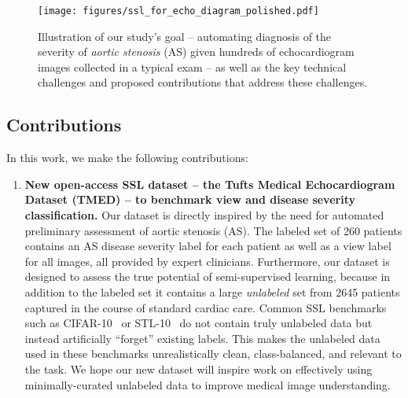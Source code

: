 \begin{figure}[!t]
	\centering
	\texttt{[image: figures/ssl\_for\_echo\_diagram\_polished.pdf]}
    \caption{Illustration of our study's goal -- automating diagnosis of the severity of \emph{aortic stenosis} (AS) given hundreds of echocardiogram images collected in a typical exam -- as well as the key technical challenges and proposed contributions that address these challenges.}
    \label{fig:ssl_for_echo_diagram}
\end{figure}

\subsection*{Contributions}
In this work, we make the following contributions:
\begin{enumerate}[leftmargin=0cm,itemindent=.4cm,labelwidth=\itemindent,labelsep=0cm,align=left]
	\item 
	\textbf{New open-access SSL dataset -- the Tufts Medical Echocardiogram Dataset (TMED) -- to benchmark view and disease severity classification.}
	Our dataset is directly inspired by the need for automated preliminary assessment of aortic stenosis (AS).
	The labeled set of 260 patients contains an AS disease severity label for each patient as well as a view label for all images, all provided by expert clinicians.
	Furthermore, our dataset is designed to assess the true potential of semi-supervised learning, because in addition to the labeled set it contains a large \emph{unlabeled} set from 2645 patients captured in the course of standard cardiac care.
	Common SSL benchmarks such as CIFAR-10~\citep{krizhevskyLearningMultipleLayers2009} or STL-10~\citep{coatesAnalysisSingleLayer2011} do not contain truly unlabeled data but instead artificially ``forget'' existing labels.
	This makes the unlabeled data used in these benchmarks unrealistically clean, class-balanced, and relevant to the task.
	We hope our new dataset will inspire work on effectively using minimally-curated unlabeled data to improve medical image understanding.
	

\end{enumerate}

